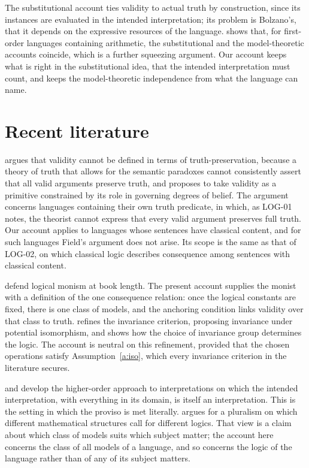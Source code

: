 \documentclass{situationist-preprint}
\begin{document}
\begin{reply}
The substitutional account ties validity to actual truth by construction, since its instances are evaluated in the intended interpretation; its problem is Bolzano's, that it depends on the expressive resources of the language. \citet{Halbach2020} shows that, for first-order languages containing arithmetic, the substitutional and the model-theoretic accounts coincide, which is a further squeezing argument. Our account keeps what is right in the substitutional idea, that the intended interpretation must count, and keeps the model-theoretic independence from what the language can name.
\end{reply}

\section{Recent literature}

\citet{Field2015} argues that validity cannot be defined in terms of truth-preservation, because a theory of truth that allows for the semantic paradoxes cannot consistently assert that all valid arguments preserve truth, and proposes to take validity as a primitive constrained by its role in governing degrees of belief. The argument concerns languages containing their own truth predicate, in which, as LOG-01 notes, the theorist cannot express that every valid argument preserves full truth. Our account applies to languages whose sentences have classical content, and for such languages Field's argument does not arise. Its scope is the same as that of LOG-02, on which classical logic describes consequence among sentences with classical content.

\citet{GriffithsPaseau2022} defend logical monism at book length. The present account supplies the monist with a definition of the one consequence relation: once the logical constants are fixed, there is one class of models, and the anchoring condition links validity over that class to truth. \citet{Bonnay2008} refines the invariance criterion, proposing invariance under potential isomorphism, and shows how the choice of invariance group determines the logic. The account is neutral on this refinement, provided that the chosen operations satisfy Assumption~\ref{a:iso}, which every invariance criterion in the literature secures.

\citet{RayoUzquiano1999} and \citet{Williamson2003} develop the higher-order approach to interpretations on which the intended interpretation, with everything in its domain, is itself an interpretation. This is the setting in which the proviso is met literally. \citet{Shapiro2014} argues for a pluralism on which different mathematical structures call for different logics. That view is a claim about which class of models suits which subject matter; the account here concerns the class of all models of a language, and so concerns the logic of the language rather than of any of its subject matters.
\end{document}
